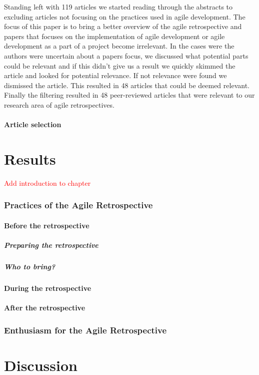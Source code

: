 \documentclass{article}
\newcommand\todo[1]{\textcolor{red}{#1}}
\begin{document}
Standing left with 119 articles we started reading through the abstracts to excluding articles not focusing on the practices used in agile development. The focus of this paper is to bring a better overview of the agile retrospective and papers that focuses on the implementation of agile development or agile development as a part of a project become irrelevant. In the cases were the authors were uncertain about a papers focus, we discussed what potential parts could be relevant and if this didn't give us a result we quickly skimmed the article and looked for potential relevance. If not relevance were found we dismissed the article. This resulted in 48 articles that could be deemed relevant. \\

Finally the filtering resulted in 48 peer-reviewed articles that were relevant to our research area of agile retrospectives. 

\subsection{Article selection}

\clearpage

\part{Results}
\todo{Add introduction to chapter}

\section{Practices of the Agile Retrospective}

\subsection{Before the retrospective}

\subsubsection{Preparing the retrospective}

\subsubsection{Who to bring?}

\subsection{During the retrospective}
\subsection{After the retrospective}

\section{Enthusiasm for the Agile Retrospective}

\clearpage

\part{Discussion}
\clearpage



\end{document}
